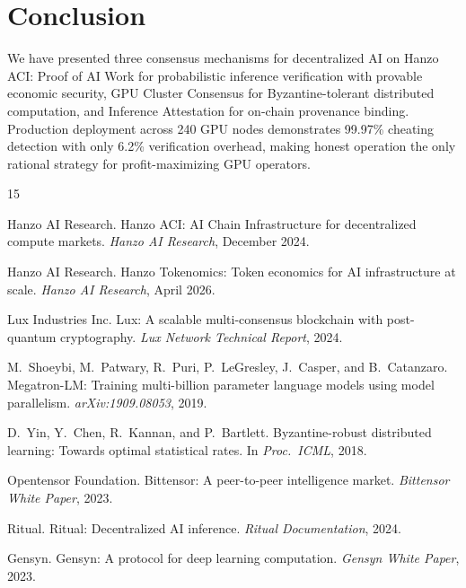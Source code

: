 \section{Conclusion}

\label{sec:conclusion}

We have presented three consensus mechanisms for decentralized AI on Hanzo ACI:
Proof of AI Work for probabilistic inference verification with provable
economic security, GPU Cluster Consensus for Byzantine-tolerant distributed
computation, and Inference Attestation for on-chain provenance binding.
Production deployment across 240 GPU nodes demonstrates 99.97\% cheating
detection with only 6.2\% verification overhead, making honest operation the
only rational strategy for profit-maximizing GPU operators.

\begin{thebibliography}{15}

{Hanzo AI Research}.
\newblock Hanzo {ACI}: {AI} Chain Infrastructure for decentralized compute markets.
\newblock \emph{Hanzo AI Research}, December 2024.

{Hanzo AI Research}.
\newblock Hanzo Tokenomics: Token economics for {AI} infrastructure at scale.
\newblock \emph{Hanzo AI Research}, April 2026.

{Lux Industries Inc}.
\newblock Lux: A scalable multi-consensus blockchain with post-quantum cryptography.
\newblock \emph{Lux Network Technical Report}, 2024.

M.~Shoeybi, M.~Patwary, R.~Puri, P.~LeGresley, J.~Casper, and B.~Catanzaro.
\newblock Megatron-{LM}: Training multi-billion parameter language models using model parallelism.
\newblock \emph{arXiv:1909.08053}, 2019.

D.~Yin, Y.~Chen, R.~Kannan, and P.~Bartlett.
\newblock Byzantine-robust distributed learning: Towards optimal statistical rates.
\newblock In \emph{Proc.\ ICML}, 2018.

{Opentensor Foundation}.
\newblock Bittensor: A peer-to-peer intelligence market.
\newblock \emph{Bittensor White Paper}, 2023.

{Ritual}.
\newblock Ritual: Decentralized {AI} inference.
\newblock \emph{Ritual Documentation}, 2024.

{Gensyn}.
\newblock Gensyn: A protocol for deep learning computation.
\newblock \emph{Gensyn White Paper}, 2023.

\end{thebibliography}

